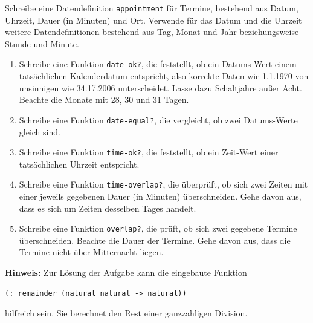 \begin{aufgabe}

  Schreibe eine Datendefinition
  \lstinline{appointment} für Termine, bestehend aus Datum, Uhrzeit,
  Dauer (in Minuten) und Ort.  Verwende für das Datum und die
  Uhrzeit weitere Datendefinitionen bestehend aus Tag, Monat und Jahr
  beziehungsweise Stunde und Minute.

  \begin{enumerate}
  \item Schreibe eine Funktion \lstinline{date-ok?}, die feststellt,
    ob ein Datums-Wert einem tatsächlichen Kalenderdatum entspricht,
    also korrekte Daten wie 1.1.1970 von unsinnigen wie 34.17.2006
    unterscheidet. Lasse dazu Schaltjahre außer Acht. Beachte
    die Monate mit 28, 30 und 31 Tagen.
  \item Schreibe eine Funktion \lstinline{date-equal?}, die
    vergleicht, ob zwei Datums-Werte gleich sind.
  \item Schreibe eine Funktion \lstinline{time-ok?}, die feststellt,
    ob ein Zeit-Wert einer tatsächlichen Uhrzeit entspricht.
  \item Schreibe eine Funktion \lstinline{time-overlap?}, die
    überprüft, ob sich zwei Zeiten mit einer jeweils gegebenen Dauer
    (in Minuten) überschneiden. Gehe davon aus, dass es sich um
    Zeiten desselben Tages handelt.
  \item Schreibe eine Funktion \lstinline{overlap?}, die prüft, ob
    sich zwei gegebene Termine überschneiden. Beachte die Dauer
    der Termine. Gehe davon aus, dass die Termine nicht über
    Mitternacht liegen.
  \end{enumerate}
  \textbf{Hinweis:} Zur Lösung der Aufgabe kann die eingebaute
  Funktion
\begin{lstlisting}
(: remainder (natural natural -> natural))
\end{lstlisting}
  hilfreich sein. Sie berechnet den Rest einer ganzzahligen Division.

\end{aufgabe}

